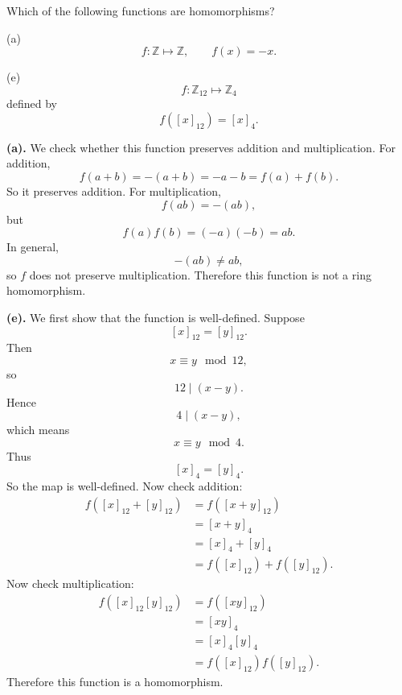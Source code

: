 \begin{problem}{
    Which of the following functions are homomorphisms?

    (a)
    \[
        f:\mathbb{Z}\mapsto\mathbb{Z},
        \qquad
        f(x)=-x.
    \]

    (e)
    \[
        f:\mathbb{Z}_{12}\mapsto\mathbb{Z}_4
    \]
    defined by
    \[
        f([x]_{12})=[x]_4.
    \]
}
    \textbf{(a).}
    We check whether this function preserves addition and multiplication.
    For addition,
    \[
        f(a+b)=-(a+b)=-a-b=f(a)+f(b).
    \]
    So it preserves addition.
    For multiplication,
    \[
        f(ab)=-(ab),
    \]
    but
    \[
        f(a)f(b)=(-a)(-b)=ab.
    \]
    In general,
    \[
        -(ab)\neq ab,
    \]
    so $f$ does not preserve multiplication.
    Therefore this function is not a ring homomorphism.

    \textbf{(e).}
    We first show that the function is well-defined.
    Suppose
    \[
        [x]_{12}=[y]_{12}.
    \]
    Then
    \[
        x\equiv y\mod{12},
    \]
    so
    \[
        12\mid (x-y).
    \]
    Hence
    \[
        4\mid (x-y),
    \]
    which means
    \[
        x\equiv y\mod 4.
    \]
    Thus
    \[
        [x]_4=[y]_4.
    \]
    So the map is well-defined.
    Now check addition:
    \begin{align*}
        f([x]_{12}+[y]_{12})
        &=
        f([x+y]_{12})\\
        &=
        [x+y]_4\\
        &=
        [x]_4+[y]_4\\
        &=
        f([x]_{12})+f([y]_{12}).
    \end{align*}
    Now check multiplication:
    \begin{align*}
        f([x]_{12}[y]_{12})
        &=
        f([xy]_{12})\\
        &=
        [xy]_4\\
        &=
        [x]_4[y]_4\\
        &=
        f([x]_{12})f([y]_{12}).
    \end{align*}
    Therefore this function is a homomorphism.
\end{problem}

